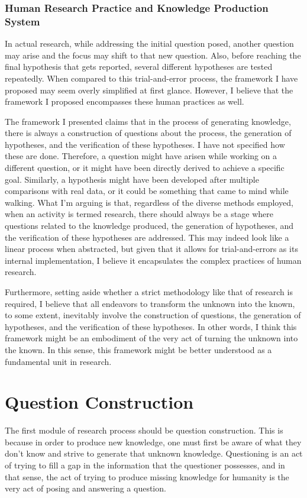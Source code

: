\subsubsection{Human Research Practice and Knowledge Production System}
In actual research, while addressing the initial question posed, another question may arise and the focus may shift to that new question. Also, before reaching the final hypothesis that gets reported, several different hypotheses are tested repeatedly. When compared to this trial-and-error process, the framework I have proposed may seem overly simplified at first glance. However, I believe that the framework I proposed encompasses these human practices as well.

The framework I presented claims that in the process of generating knowledge, there is always a construction of questions about the process, the generation of hypotheses, and the verification of these hypotheses. I have not specified how these are done. Therefore, a question might have arisen while working on a different question, or it might have been directly derived to achieve a specific goal. Similarly, a hypothesis might have been developed after multiple comparisons with real data, or it could be something that came to mind while walking. What I'm arguing is that, regardless of the diverse methods employed, when an activity is termed research, there should always be a stage where questions related to the knowledge produced, the generation of hypotheses, and the verification of these hypotheses are addressed. This may indeed look like a linear process when abstracted, but given that it allows for trial-and-errors as its internal implementation, I believe it encapsulates the complex practices of human research.

Furthermore, setting aside whether a strict methodology like that of research is required, I believe that all endeavors to transform the unknown into the known, to some extent, inevitably involve the construction of questions, the generation of hypotheses, and the verification of these hypotheses. In other words, I think this framework might be an embodiment of the very act of turning the unknown into the known. In this sense, this framework might be better understood as a fundamental unit in research.

\section{Question Construction}

The first module of research process should be question construction. This is because in order to produce new knowledge, one must first be aware of what they don't know and strive to generate that unknown knowledge. Questioning is an act of trying to fill a gap in the  information that the questioner possesses, and in that sense, the act of trying to produce missing knowledge for humanity is the very act of posing and answering a question.

